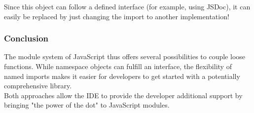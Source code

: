 Since this object can follow a defined interface (for example, using JSDoc), it
can easily be replaced by just changing the import to another implementation!

\subsubsection{Conclusion} %
\label{sec:Conclusion}
The module system of JavaScript thus offers several possibilities to couple
loose functions. While namespace objects can fulfill an interface, the
flexibility of named imports makes it easier for developers to get started with
a potentially comprehensive library. \\ 
Both approaches allow the IDE to provide the developer additional support by
bringing "the power of the dot" to JavaScript modules.

